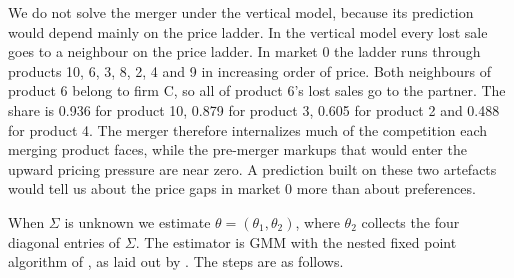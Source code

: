We do not solve the merger under the vertical model, because its prediction would depend mainly on the price ladder.
In the vertical model every lost sale goes to a neighbour on the price ladder. In market 0 the ladder runs through
products 10, 6, 3, 8, 2, 4 and 9 in increasing order of price. Both neighbours of product 6 belong to firm C, so all of product 6's lost
sales go to the partner. The share is 0.936 for product 10, 0.879 for product 3, 0.605 for product 2 and 0.488 for
product 4. The merger therefore internalizes much of the competition each merging product faces, while the
pre-merger markups that would enter the upward pricing pressure are near zero. A prediction built on these two
artefacts would tell us about the price gaps in market 0 more than about preferences.

When $\Sigma$ is unknown we estimate $\theta = (\theta_1, \theta_2)$, where $\theta_2$ collects the four diagonal
entries of $\Sigma$. The estimator is GMM with the nested fixed point algorithm of \citet{BerryLevinsohnPakes1995}, as
laid out by \citet[Section 3.3]{Nevo2000a}. The steps are as follows.
